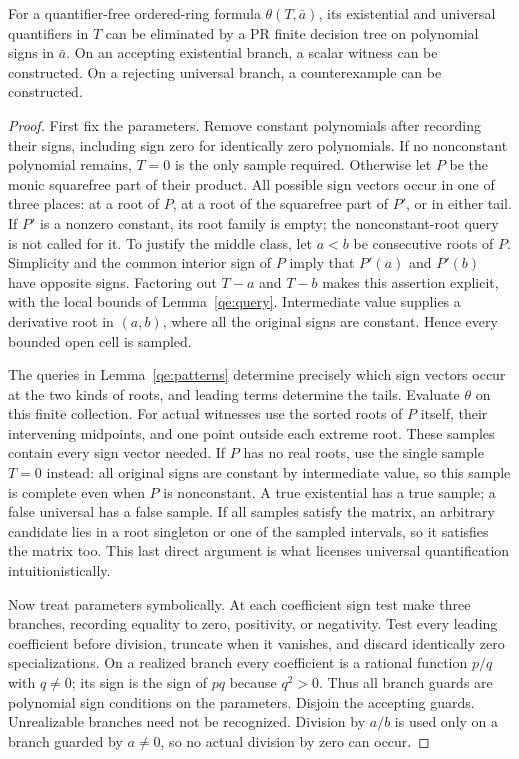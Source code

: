 \begin{theorem}\label{qe:one}
For a quantifier-free ordered-ring formula $\theta(T,\bar a)$, its
existential and universal quantifiers in $T$ can be eliminated by a PR
finite decision tree on polynomial signs in $\bar a$. On an accepting
existential branch, a scalar witness can be constructed. On a rejecting
universal branch, a counterexample can be constructed.
\end{theorem}
\begin{proof}
First fix the parameters. Remove constant polynomials after recording
their signs, including sign zero for identically zero polynomials.
If no nonconstant polynomial remains, $T=0$ is the only
sample required. Otherwise let $P$ be the monic squarefree part of their
product. All possible sign vectors occur in one of three places: at a
root of $P$, at a root of the squarefree part of $P'$, or in either tail.
If $P'$ is a nonzero constant, its root family is empty; the
nonconstant-root query is not called for it.
To justify the middle class, let $a<b$ be consecutive roots of $P$.
Simplicity and the common interior sign of $P$ imply that $P'(a)$ and
$P'(b)$ have opposite signs. Factoring out $T-a$ and $T-b$ makes this
assertion explicit, with the local bounds of Lemma~\ref{qe:query}.
Intermediate value supplies a derivative root in $(a,b)$, where all the
original signs are constant. Hence every bounded open cell is sampled.

The queries in Lemma~\ref{qe:patterns} determine precisely which sign
vectors occur at the two kinds of roots, and leading terms determine the
tails. Evaluate $\theta$ on this finite collection. For actual witnesses
use the sorted roots of $P$ itself, their intervening midpoints, and one
point outside each extreme root. These samples contain every sign vector
needed. If $P$ has no real roots, use the single sample $T=0$ instead:
all original signs are constant by intermediate value, so this sample
is complete even when $P$ is nonconstant.
A true existential has a true sample; a false universal has a
false sample. If all samples satisfy the matrix, an arbitrary candidate
lies in a root singleton or one of the sampled intervals, so it satisfies
the matrix too. This last direct argument is what licenses universal
quantification intuitionistically.

Now treat parameters symbolically. At each coefficient sign test make
three branches, recording equality to zero, positivity, or negativity.
Test every leading coefficient before division, truncate when it vanishes,
and discard identically zero specializations. On a realized branch every
coefficient is a rational function $p/q$ with $q\ne0$; its sign is the
sign of $pq$ because $q^2>0$. Thus all branch guards are polynomial
sign conditions on the parameters. Disjoin the accepting guards.
Unrealizable branches need not be recognized. Division by $a/b$ is used
only on a branch guarded by $a\ne0$, so no actual division by zero
can occur.


\end{proof}
